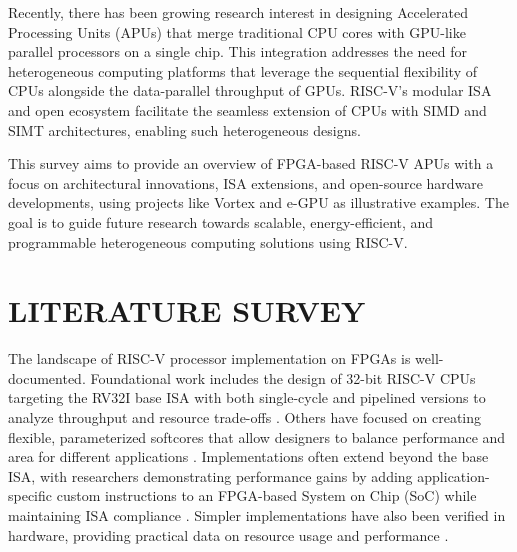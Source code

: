 \documentclass[a4paper,twoside]{article}
\begin{document}
Recently, there has been growing research interest in designing Accelerated Processing Units (APUs) that merge traditional CPU cores with GPU-like parallel processors on a single chip. This integration addresses the need for heterogeneous computing platforms that leverage the sequential flexibility of CPUs alongside the data-parallel throughput of GPUs. RISC-V's modular ISA and open ecosystem facilitate the seamless extension of CPUs with SIMD and SIMT architectures, enabling such heterogeneous designs.

This survey aims to provide an overview of FPGA-based RISC-V APUs with a focus on architectural innovations, ISA extensions, and open-source hardware developments, using projects like Vortex and e-GPU as illustrative examples. The goal is to guide future research towards scalable, energy-efficient, and programmable heterogeneous computing solutions using RISC-V.

\section{\uppercase{Literature Survey}}
\label{sec:survey}

The landscape of RISC-V processor implementation on FPGAs is well-documented. Foundational work includes the design of 32-bit RISC-V CPUs targeting the RV32I base ISA with both single-cycle and pipelined versions to analyze throughput and resource trade-offs \cite{Rao2024}. Others have focused on creating flexible, parameterized softcores that allow designers to balance performance and area for different applications \cite{Rodrigues2019}. Implementations often extend beyond the base ISA, with researchers demonstrating performance gains by adding application-specific custom instructions to an FPGA-based System on Chip (SoC) while maintaining ISA compliance \cite{Li2019}. Simpler implementations have also been verified in hardware, providing practical data on resource usage and performance \cite{Begum2023}.
\end{document}
